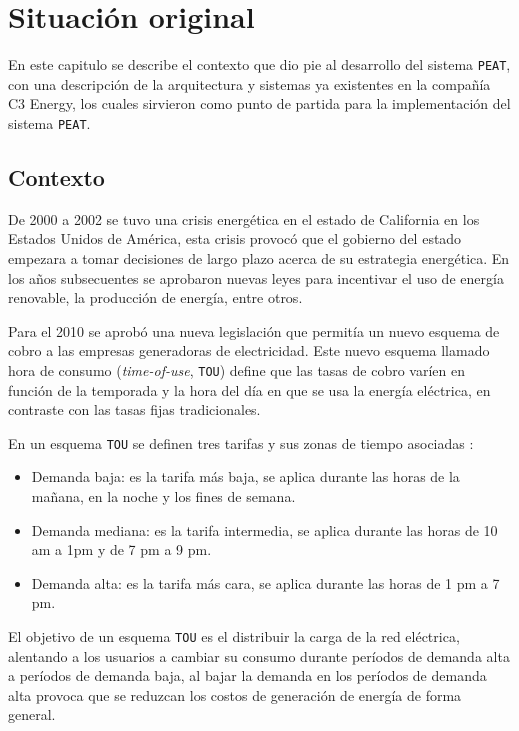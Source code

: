 \chapter{Situación original}

En este capitulo se describe el contexto que dio pie al desarrollo del sistema
\texttt{PEAT}, con una descripción de la arquitectura y sistemas ya existentes
en la compañía C3 Energy, los cuales sirvieron como punto de partida para la
implementación del sistema \texttt{PEAT}.

\section{Contexto}
De 2000 a 2002 se tuvo una crisis energética en el estado de California en los
Estados Unidos de América, esta crisis provocó que el gobierno del estado empezara a
tomar decisiones de largo plazo acerca de su estrategia energética. En los años
subsecuentes se aprobaron nuevas leyes para incentivar el uso de energía renovable,
la producción de energía, entre otros.

Para el 2010 se aprobó una nueva legislación que permitía un nuevo esquema
de cobro a las empresas generadoras de electricidad. Este nuevo esquema
llamado hora de consumo (\textit{time-of-use}, \texttt{TOU}) define que las
tasas de cobro varíen en función de la temporada y la hora del día en que
se usa la energía eléctrica, en contraste con las tasas fijas tradicionales.

\vspace{2.5mm}

En un esquema \texttt{TOU} se definen tres tarifas y sus zonas de tiempo asociadas
\cite{16_pge_time_of_use_2015}:

\begin{itemize}
\item  Demanda baja: es la tarifa más baja, se aplica durante las horas de la
  mañana, en la noche y los fines de semana.
\item Demanda mediana: es la tarifa intermedia, se aplica durante las horas de
  10 am a 1pm y de 7 pm a 9 pm.
\item Demanda alta: es la tarifa más cara, se aplica durante las horas de
  1 pm a 7 pm.
\end{itemize}

El objetivo de un esquema \texttt{TOU} es el distribuir la carga de la red
eléctrica, alentando a los usuarios a cambiar su consumo durante períodos
de demanda alta a períodos de demanda baja, al bajar la demanda en los períodos
de demanda alta provoca que se reduzcan los costos de generación de energía de
forma general.

